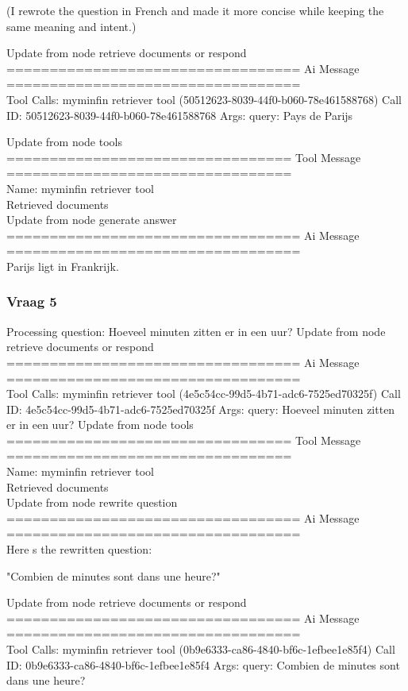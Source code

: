 (I rewrote the question in French and made it more concise while keeping the same meaning and intent.)

Update from node retrieve documents or respond
\\[1em]
================================== Ai Message ==================================
\\[1em]
Tool Calls:
myminfin retriever tool (50512623-8039-44f0-b060-78e461588768)
Call ID: 50512623-8039-44f0-b060-78e461588768
Args:
query: Pays de Parijs

Update from node tools
\\[1em]
================================= Tool Message =================================
\\[1em]
Name: myminfin retriever tool
\\[1em]
Retrieved documents
\\[1em]
Update from node generate answer
\\[1em]
================================== Ai Message ==================================
\\[1em]
Parijs ligt in Frankrijk.

\subsubsection{Vraag 5}
Processing question: Hoeveel minuten zitten er in een uur?
Update from node retrieve documents or respond
\\[1em]
================================== Ai Message ==================================
\\[1em]
Tool Calls:
myminfin retriever tool (4e5c54cc-99d5-4b71-adc6-7525ed70325f)
Call ID: 4e5c54cc-99d5-4b71-adc6-7525ed70325f
Args:
query: Hoeveel minuten zitten er in een uur?
Update from node tools
\\[1em]
================================= Tool Message =================================
\\[1em]
Name: myminfin retriever tool
\\[1em]
Retrieved documents
\\[1em]
Update from node rewrite question
\\[1em]
================================== Ai Message ==================================
\\[1em]
Here s the rewritten question:

"Combien de minutes sont dans une heure?"

Update from node retrieve documents or respond
\\[1em]
================================== Ai Message ==================================
\\[1em]
Tool Calls:
myminfin retriever tool (0b9e6333-ca86-4840-bf6c-1efbee1e85f4)
Call ID: 0b9e6333-ca86-4840-bf6c-1efbee1e85f4
Args:
query: Combien de minutes sont dans une heure?

